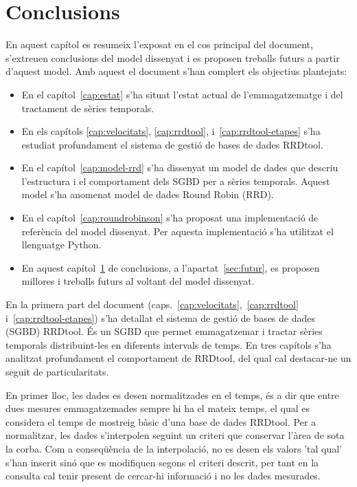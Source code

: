 \chapter{Conclusions}
\label{cap:conclusions}

En aquest capítol es resumeix l'exposat en el cos principal del document, s'extreuen conclusions del model dissenyat i es proposen treballs futurs a partir d'aquest model. Amb aquest el document s'han complert els objectius plantejats:

\begin{itemize}
\item En el capítol~\ref{cap:estat} s'ha situat l'estat actual de l'emmagatzematge i del tractament de sèries temporals.

\item En els capítols \ref{cap:velocitats}, \ref{cap:rrdtool}, i~\ref{cap:rrdtool-etapes} s'ha estudiat profundament el sistema de gestió de bases de dades RRDtool.

\item En el capítol~\ref{cap:model-rrd} s'ha dissenyat un model de dades que descriu l'estructura i el comportament dels SGBD per a sèries temporals. Aquest model s'ha anomenat model de dades Round Robin (RRD).

\item En el capítol~\ref{cap:roundrobinson} s'ha proposat una implementació de referència del model dissenyat. Per aquesta implementació s'ha utilitzat el llenguatge Python.

\item En aquest capítol~\ref{cap:conclusions} de conclusions, a l'apartat~\ref{sec:futur}, es proposen millores i treballs futurs al voltant del model dissenyat.
\end{itemize}

En la primera part del document (caps.~\ref{cap:velocitats},~\ref{cap:rrdtool} i~\ref{cap:rrdtool-etapes}) s'ha detallat el sistema de gestió de bases de dades (SGBD) RRDtool. És un SGBD que permet emmagatzemar i tractar sèries temporals distribuint-les en diferents intervals de temps. En tres capítols s'ha analitzat profundament el comportament de RRDtool, del qual cal destacar-ne un seguit de particularitats.

En primer lloc, les dades es desen normalitzades en el temps, és a dir que entre dues mesures emmagatzemades sempre hi ha el mateix temps, el qual es considera el temps de mostreig bàsic d'una base de dades RRDtool. Per a normalitzar, les dades s'interpolen seguint un criteri que conservar l'àrea de sota la corba. Com a conseqüència de la interpolació, no es desen els valors 'tal qual' s'han inserit sinó que es modifiquen segons el criteri descrit, per tant en la consulta cal tenir present de cercar-hi informació i no les dades mesurades. 

